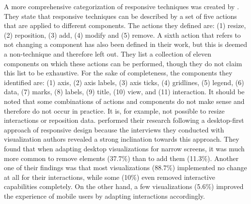 A more comprehensive categorization of responsive techniques was created by \cite{TechniquesForFlexibleRespVisDesign}. They state that responsive techniques can be described by a set of five actions that are applied to different components. The actions they defined are: (1) resize, (2) reposition, (3) add, (4) modify and (5) remove. A sixth action that refers to not changing a component has also been defined in their work, but this is deemed a non-technique and therefore left out. They list a collection of eleven components on which these actions can be performed, though they do not claim this list to be exhaustive. For the sake of completeness, the components they identified are: (1) axis, (2) axis labels, (3) axis ticks, (4) gridlines, (5) legend, (6) data, (7) marks, (8) labels, (9) title, (10) view, and (11) interaction. It should be noted that some combinations of actions and components do not make sense and therefore do not occur in practice. It is, for example, not possible to resize interactions or reposition data. \cite{TechniquesForFlexibleRespVisDesign} performed their research following a desktop-first approach of responsive design because the interviews they conducted with visualization authors revealed a strong inclination towards this approach. They found that when adapting desktop visualizations for narrow screens, it was much more common to remove elements (37.7\%) than to add them (11.3\%). Another one of their findings was that most visualizations (88.7\%) implemented no change at all for their interactions, while some (10\%) even removed interactive capabilities completely. On the other hand, a few visualizations (5.6\%) improved the experience of mobile users by adapting interactions accordingly.

